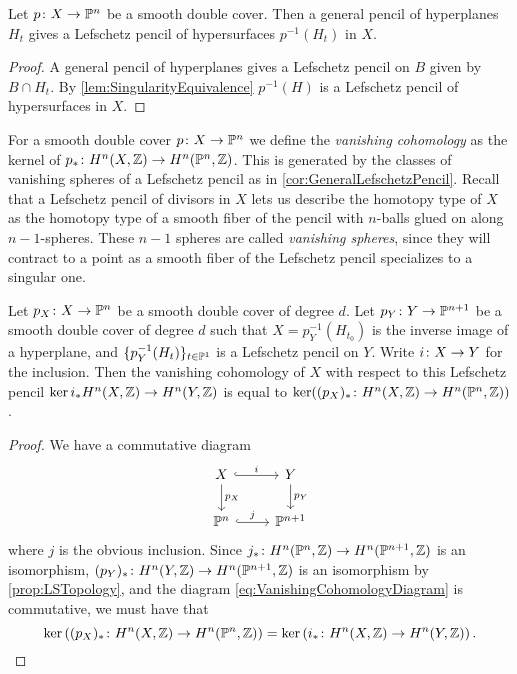 \begin{corollary}
	\label{cor:GeneralLefschetzPencil}
  Let $p \colon X \to \mathbb{P}^n$ be a smooth double cover. Then a general pencil of hyperplanes $H_t$ gives a Lefschetz pencil  of hypersurfaces $p^{-1}(H_t)$ in $X$.
\end{corollary}
\begin{proof}
  A general pencil of hyperplanes gives a Lefschetz pencil on $B$ given by $B \cap H_t$. By \cref{lem:SingularityEquivalence} $p^{-1}(H)$ is a Lefschetz pencil of hypersurfaces in $X$.
\end{proof}
For a smooth double cover $p \colon X \to \mathbb{P}^n$ we define the \emph{vanishing cohomology} as the kernel of $p_* \colon H^n(X,\mathbb{Z}) \to H^n(\mathbb{P}^n,\mathbb{Z})$. This is generated by the classes of vanishing spheres of a Lefschetz pencil as in \cref{cor:GeneralLefschetzPencil}. Recall that a Lefschetz pencil of divisors in $X$ lets us describe the homotopy type of $X$ as the homotopy type of a smooth fiber of the pencil with $n$-balls glued on along $n-1$-spheres. These $n-1$ spheres are called \emph{vanishing spheres}, since they will contract to a point as a smooth fiber of the Lefschetz pencil specializes to a singular one.
\begin{lemma}
	\label{lem:VanishingCommutes}
	Let $p_X \colon X \to \mathbb{P}^n$ be a smooth double cover of degree $d$.
	Let $p_Y \colon Y \to \mathbb{P}^{n+1}$ be a smooth double cover of degree $d$ such
	that $X = p_Y^{-1}(H_{t_0})$ is the inverse image of a hyperplane, and $\lbrace p^{-1}_Y(H_t)\rbrace_{t \in \mathbb{P}^1}$ is a Lefschetz pencil on $Y$. Write $i \colon X \to Y$ for the inclusion. Then the vanishing cohomology of $X$
	with respect to this Lefschetz pencil \ie $\ker i_* H^n(X,\mathbb{Z}) \to H^n(Y,\mathbb{Z})$ is equal to
	$\ker((p_X)_* \colon H^n(X,\mathbb{Z}) \to H^n(\mathbb{P}^n,\mathbb{Z}))$.
\end{lemma}
\begin{proof}
	We have a commutative diagram
	\begin{equation}
		\label{eq:VanishingCohomologyDiagram}
		\begin{tikzcd}
			X \arrow[hook,r,"i"] \arrow[d,"p_X"]& Y \arrow[d,"p_Y"] \\
			\P^n \arrow[hook,r,"j"]& \P^{n+1}
		\end{tikzcd}
	\end{equation}
	where $j$ is the obvious inclusion.
	Since  $j_* \colon H^n(\mathbb{P}^n,\mathbb{Z}) \to H^n(\mathbb{P}^{n+1},\mathbb{Z})$ is an isomorphism, $(p_Y)_* \colon H^n(Y,\mathbb{Z}) \to H^n(\mathbb{P}^{n+1},\mathbb{Z})$ is an isomorphism by \cref{prop:LSTopology}, and the diagram \eqref{eq:VanishingCohomologyDiagram} is commutative,
we must have that 
	\begin{equation*}
		\ker\left((p_X)_* \colon H^n(X,\mathbb{Z}) \to H^n(\mathbb{P}^n,\mathbb{Z})\right) = \ker\left(i_* \colon H^n(X,\mathbb{Z}) \to H^n(Y,\mathbb{Z})\right).
	\end{equation*}
\end{proof}


